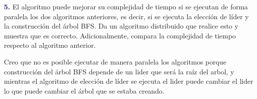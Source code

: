 \newpage
\textbf{\textcolor{MidnightBlue}{5.}} El algoritmo puede mejorar su complejidad de tiempo si se ejecutan de forma paralela
los dos algoritmos anteriores, es decir, si se ejecuta la elección de líder y la construcción del árbol BFS. Da un algoritmo distribuido que realice esto y muestra que es correcto. Adicionalmente, compara la complejidad de tiempo respecto al algoritmo anterior.

Creo que no es posible ejecutar de manera paralela los algoritmos porque construcción del árbol BFS depende de un lider que será la raíz del arbol, y mientras el algoritmo de elección de líder se ejecuta el lider puede cambiar el lider lo que puede cambiar el árbol que se estaba creando.